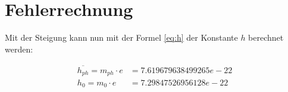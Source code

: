 \section{Fehlerrechnung}

Mit  der  Steigung  kann  nun mit der  Formel  \ref{eq:h}  der  Konstante  $h$
berechnet werden:

\begin{align*}
    \overline{h_{ph}} = m_{ph} \cdot e &= 7.619679638499265e-22 \\
    h_0 = m_0 \cdot e       &= 7.29847526956128e-22 \\
\end{align*}


